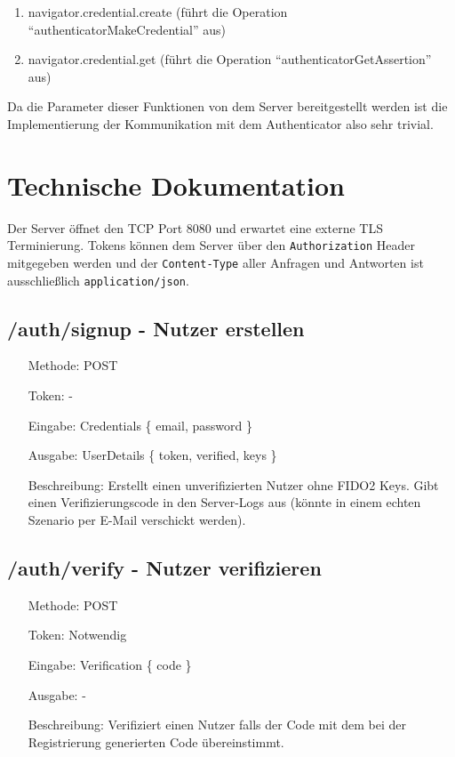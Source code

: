 \documentclass[journal]{IEEEtran}
\begin{document}
\begin{enumerate}
	\item navigator.credential.create (führt die Operation
		``authenticatorMakeCredential'' aus)
	\item navigator.credential.get (führt die Operation
		``authenticatorGetAssertion'' aus)
\end{enumerate}

Da die Parameter dieser Funktionen von dem Server bereitgestellt werden ist die
Implementierung der Kommunikation mit dem Authenticator also sehr trivial.

\section{Technische Dokumentation}\label{docs}

Der Server öffnet den TCP Port 8080 und erwartet eine externe TLS
Terminierung. Tokens können dem Server über den \texttt{Authorization} Header
mitgegeben werden und der \texttt{Content-Type} aller Anfragen und Antworten
ist ausschließlich \texttt{application/json}.

\subsection{/auth/signup - Nutzer erstellen}

\begin{itemize}
	\setlength{\leftskip}{1.5cm}
	\setlength{\itemsep}{0pt}
	\item[Methode:] POST
	\item[Token:] -
	\item[Eingabe:] Credentials \{ email, password \}
	\item[Ausgabe:] UserDetails \{ token, verified, keys \}
	\item[Beschreibung:] Erstellt einen unverifizierten Nutzer ohne FIDO2 Keys.
		Gibt einen Verifizierungscode in den Server-Logs aus (könnte in einem
		echten Szenario per E-Mail verschickt werden).
\end{itemize}

\subsection{/auth/verify - Nutzer verifizieren}

\begin{itemize}
	\setlength{\leftskip}{1.5cm}
	\setlength{\itemsep}{0pt}
	\item[Methode:] POST
	\item[Token:] Notwendig
	\item[Eingabe:] Verification \{ code \}
	\item[Ausgabe:] -
	\item[Beschreibung:] Verifiziert einen Nutzer falls der Code mit dem bei
		der Registrierung generierten Code übereinstimmt.
\end{itemize}
\end{document}
